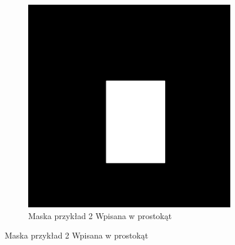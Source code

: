 \documentclass[a4paper,11pt,twoside]{report}
\theoremstyle{definition}
\begin{document}
\begin{figure}[htb]
\begin{subfigure}{0.25\textwidth}
		\includegraphics[width=\linewidth]{Mask/2/square.png}
		\caption{Maska przykład 2 Wpisana w prostokąt}
		\label{fig:2}
	\end{subfigure}\hfil %
	

\end{figure}
\end{document}
